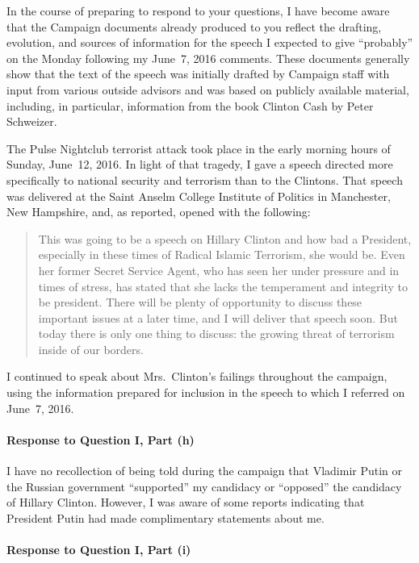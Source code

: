 In the course of preparing to respond to your questions, I have become aware that the Campaign documents already produced to you reflect the drafting, evolution, and sources of information for the speech I expected to give ``probably'' on the Monday following my June~7, 2016 comments.
These documents generally show that the text of the speech was initially drafted by Campaign staff with input from various outside advisors and was based on publicly available material, including, in particular, information from the book Clinton Cash by Peter Schweizer.

The Pulse Nightclub terrorist attack took place in the early morning hours of Sunday, June~12, 2016.
In light of that tragedy, I gave a speech directed more specifically to national security and terrorism than to the Clintons.
That speech was delivered at the Saint Anselm College Institute of Politics in Manchester, New Hampshire, and, as reported, opened with the following:

\begin{quote}
This was going to be a speech on Hillary Clinton and how bad a President, especially in these times of Radical Islamic Terrorism, she would be.
Even her former Secret Service Agent, who has seen her under pressure and in times of stress, has stated that she lacks the temperament and integrity to be president.
There will be plenty of opportunity to discuss these important issues at a later time, and I will deliver that speech soon.
But today there is only one thing to discuss: the growing threat of terrorism inside of our borders.
\end{quote}

I continued to speak about Mrs.~Clinton's failings throughout the campaign, using the information prepared for inclusion in the speech to which I referred on June~7, 2016.

\paragraph*{Response to Question I, Part (h)}

I have no recollection of being told during the campaign that Vladimir Putin or the Russian government ``supported'' my candidacy or ``opposed'' the candidacy of Hillary Clinton.
However, I was aware of some reports indicating that President Putin had made complimentary statements about me.

\paragraph*{Response to Question I, Part (i)}


